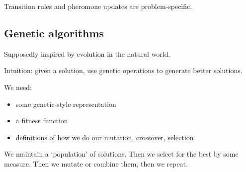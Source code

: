\documentclass[11pt]{article}
\begin{document}
Transition rules and pheromone updates are problem-specific.

\subsection{Genetic algorithms}

Supposedly inspired by evolution in the natural world.

Intuition: given a solution, use genetic operations to generate better solutions.

We need:
\begin{itemize}
    \item some genetic-style representation
    \item a fitness function
    \item definitions of how we do our mutation, crossover, selection
\end{itemize}

We maintain a `population' of solutions. Then we select for the best by some measure. Then we mutate or combine them, then we repeat.
\end{document}
